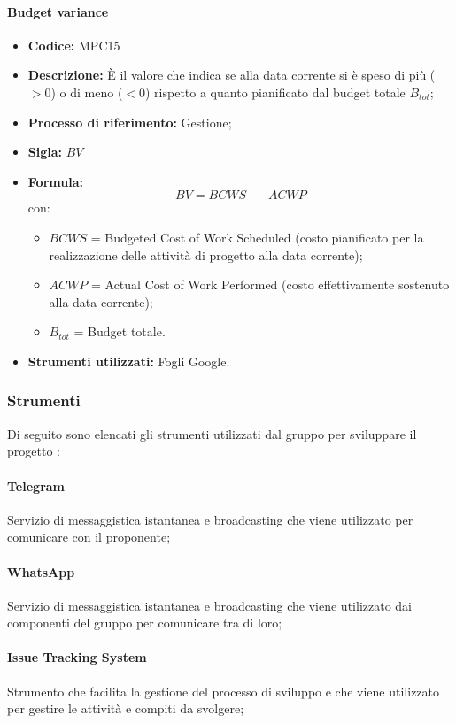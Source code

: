 \paragraph{Budget variance}
\begin{itemize}
	\item \textbf{Codice:} MPC15
	\item \textbf{Descrizione:} È il valore che indica se alla data corrente si è speso di più ($>0$) o di meno ($<0$) rispetto a quanto pianificato dal budget totale $B_{tot}$;
	\item \textbf{Processo di riferimento:} Gestione;
	\item \textbf{Sigla:} $BV$
	\item \textbf{Formula:} $$BV = {BCWS \; - \; ACWP}$$
	con:
	\begin{itemize}
		\item $BCWS$ = Budgeted Cost of Work Scheduled (costo pianificato per la realizzazione delle attività di progetto alla data corrente);
		\item $ACWP$ = Actual Cost of Work Performed (costo effettivamente sostenuto alla data corrente);
		\item $B_{tot}$ = Budget totale.
	\end{itemize}
	\item \textbf{Strumenti utilizzati:} Fogli Google.
\end{itemize}

\subsubsection{Strumenti}
Di seguito sono elencati gli strumenti utilizzati dal gruppo per sviluppare il progetto \glo{\NomeProgetto{}}:

\paragraph{Telegram} 
Servizio di messaggistica istantanea e broadcasting che viene utilizzato per comunicare con il proponente;
\paragraph{WhatsApp} 
Servizio di messaggistica istantanea e broadcasting che viene utilizzato dai componenti del gruppo per comunicare tra di loro;
\paragraph{Issue Tracking System} 
Strumento che facilita la gestione del processo di sviluppo e che viene utilizzato per gestire le attività e compiti da svolgere;

